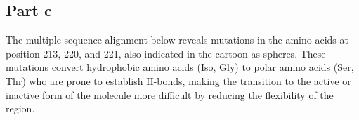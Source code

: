 \documentclass[11pt, a4paper,titlepage]{article}
\begin{document}
\subsection*{Part c}
The multiple sequence alignment below reveals mutations in the amino
acids at position 213, 220, and 221, also indicated in the cartoon as
spheres. These mutations convert hydrophobic amino acids (Iso, Gly) to
polar amino acids (Ser, Thr) who are prone to establish H-bonds,
making the transition to the active or inactive form of the molecule
more difficult by reducing the flexibility of the region.

 
\end{document}
